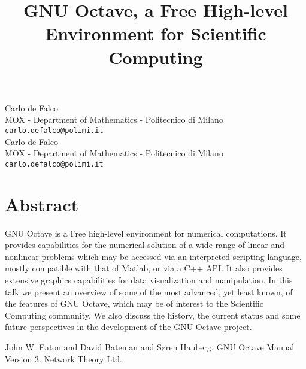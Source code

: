 \documentclass[article,A4,11pt]{llncs}%
\begin{document}
\title{GNU Octave, a Free High-level Environment for Scientific Computing}
 \author{} \institute{}
\maketitle
\begin{center}
{\large Carlo de Falco}\\
MOX - Department of Mathematics - Politecnico di Milano\\
{\tt carlo.defalco@polimi.it}
\\ \vspace{4mm}
{\large Carlo de Falco}\\
MOX - Department of Mathematics - Politecnico di Milano\\
{\tt carlo.defalco@polimi.it}
\end{center}

\section*{Abstract}
GNU Octave is a Free high-level environment for
 numerical computations. 
It provides capabilities for the numerical solution of a wide range of linear and 
nonlinear problems which may be accessed via an
 interpreted scripting language, mostly 
compatible with that of Matlab, or via a 
C++ API. 
It also provides extensive graphics capabilities for data visualization and manipulation. 
In this talk we present an overview of some of the most advanced, yet least known, of the features of GNU Octave, which may be of interest to the Scientific Computing community. 
We also discuss the history, the current status and some future perspectives in the development of the GNU Octave project.


\begin{thebibliography}{10}
{\sc John W. Eaton and David Bateman and Søren Hauberg}. {GNU Octave Manual Version 3}. Network Theory Ltd.
\end{thebibliography}
\end{document}
